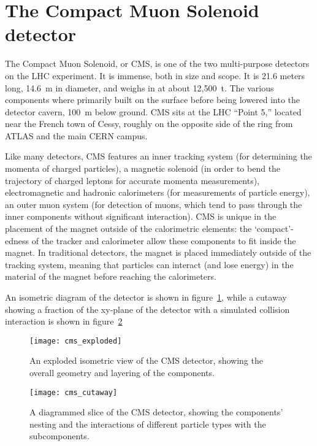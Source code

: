 \section{The Compact Muon Solenoid detector}
\label{section:cms}
The Compact Muon Solenoid, or CMS, is one of the two multi-purpose detectors on
the LHC experiment. It is immense, both in size and scope. It is 21.6 meters
long, 14.6~m in diameter, and weighs in at about 12,500~t. The various
components where primarily built on the surface before being lowered into the
detector cavern, 100~m below ground. CMS sits at the LHC ``Point 5,'' located
near the French town of Cessy, roughly on the opposite side of the ring from
ATLAS and the main CERN campus. 

Like many detectors, CMS features an inner tracking system (for determining the
momenta of charged particles), a magnetic solenoid (in order to bend the
trajectory of charged leptons for accurate momenta measurements),
electromagnetic and hadronic calorimeters (for measurements of particle energy),
an outer muon system (for detection of muons, which tend to pass through the
inner components without significant interaction). CMS is unique in the
placement of the magnet outside of the calorimetric elements: the
`compact'-edness of the tracker and calorimeter allow these components to fit
inside the magnet. In traditional detectors, the magnet is placed immediately
outside of the tracking system, meaning that particles can interact (and lose
energy) in the material of the magnet before reaching the calorimeters.

An isometric diagram of the detector is shown in figure~\ref{fig:cmsExploded},
while a cutaway showing a fraction of the xy-plane of the detector with a
simulated collision interaction is shown in figure~\ref{fig:cmsCutaway}

\begin{figure}[h]
\centering
\texttt{[image: cms\_exploded]}
\caption[Isometric view of CMS]{An exploded isometric view of the CMS detector, showing the overall
geometry and layering of the components.}
\label{fig:cmsExploded}
\end{figure}

\begin{figure}[h]
\centering
\texttt{[image: cms\_cutaway]}
\caption[A cutaway slice of the CMS detector.]{A diagrammed slice of the CMS detector, showing the components' nesting
and the interactions of different particle types with the subcomponents.}
\label{fig:cmsCutaway}
\end{figure}

